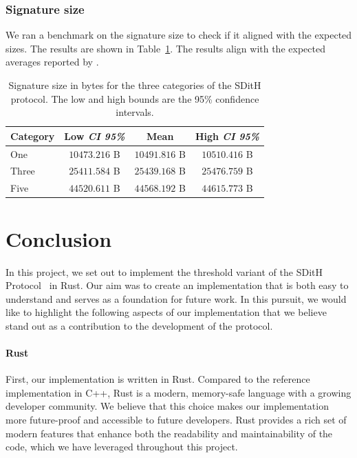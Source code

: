 \documentclass[11pt]{report}
\theoremstyle{definition}
\theoremstyle{plain}
\begin{document}
\subsection{Signature size}
We ran a benchmark on the signature size to check if it aligned with the expected sizes. The results are shown in Table~\ref{tab:sig_size}. The results align with the expected averages reported by \cite{aguilarsyndrome11}.

\begin{table}[ht!]
  \centering
  \begin{tabular}{lccc}
    \hline
    \textbf{Category} & \textbf{Low \textit{CI 95\%}} & \textbf{Mean} & \textbf{High \textit{CI 95\%}} \\
    \hline
    One               & $10473.216$ B                 & $10491.816$ B & $10510.416$ B                  \\
    Three             & $25411.584$ B                 & $25439.168$ B & $25476.759$ B                  \\
    Five              & $44520.611$ B                 & $44568.192$ B & $44615.773$ B                  \\
    \hline
  \end{tabular}
  \caption{Signature size in bytes for the three categories of the SDitH protocol. The low and high bounds are the 95\% confidence intervals.}\label{tab:sig_size}
\end{table}


\chapter{Conclusion}\label{ch:conclusion}

In this project, we set out to implement the threshold variant of the SDitH Protocol~\cite{aguilarsyndrome11} in Rust. Our aim was to create an implementation that is both easy to understand and serves as a foundation for future work. In this pursuit, we would like to highlight the following aspects of our implementation that we believe stand out as a contribution to the development of the protocol.

\subsubsection{Rust}

First, our implementation is written in Rust. Compared to the reference implementation in C++, Rust is a modern, memory-safe language with a growing developer community. We believe that this choice makes our implementation more future-proof and accessible to future developers. Rust provides a rich set of modern features that enhance both the readability and maintainability of the code, which we have leveraged throughout this project.
\end{document}

